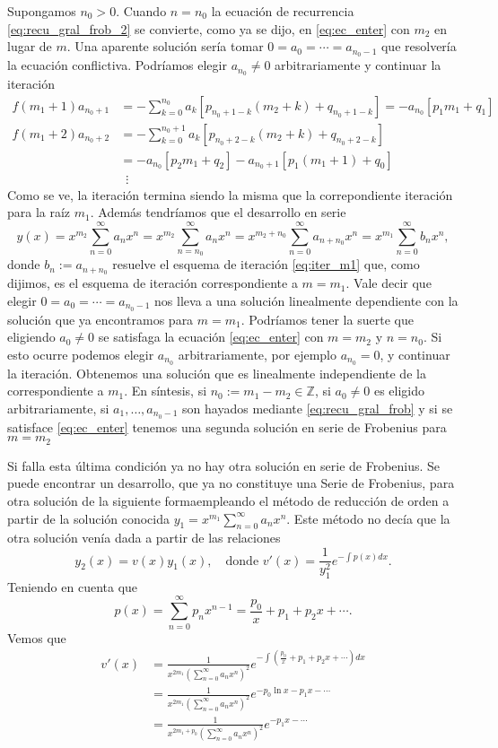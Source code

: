 \documentclass{article}
\newcounter{cor_cont}
\newcounter{ejem_cont}
\renewcommand{\emph}[1]{\textcolor[rgb]{0,0,1}{#1}}
\begin{document}
Supongamos $n_0>0$.  Cuando $n=n_0$ la ecuación de recurrencia  \eqref{eq:recu_gral_frob_2} se convierte, como ya se dijo, en \eqref{eq:ec_enter} con $m_2$ en lugar de $m$. Una aparente solución sería tomar  $0=a_0=\cdots=a_{n_0-1}$ que resolvería la ecuación conflictiva. Podríamos elegir $a_{n_0}\neq 0$ arbitrariamente y continuar la iteración
\begin{equation}\label{eq:iter_m1}
  \begin{split}
    f(m_1+1)a_{n_0+1}&=-\sum_{k=0}^{n_0}a_k\left[p_{n_0+1-k}(m_2+k) + q_{n_0+1-k}\right]=-a_{n_0}[p_1m_1+q_1]\\
   f(m_1+2) a_{n_0+2}&=-\sum_{k=0}^{n_0+1}a_k\left[p_{n_0+2-k}(m_2+k) + q_{n_0+2-k}\right]\\
                   &=-a_{n_0}[p_2m_1+q_2]-a_{n_0+1}[p_1(m_1+1)+q_0]\\
                   &\,\,\,\vdots
  \end{split}
\end{equation}
Como se ve, la iteración termina siendo la misma que la correpondiente iteración para la raíz $m_1$. Además tendríamos que el desarrollo en serie
\[y(x)=x^{m_2}\sum_{n=0}^{\infty}a_nx^n=x^{m_2}\sum_{n=n_0}^{\infty}a_nx^n
 =x^{m_2+n_0}\sum_{n=0}^{\infty}a_{n+n_0}x^n
=x^{m_1}\sum_{n=0}^{\infty}b_nx^n
,\]
donde $b_n:=a_{n+n_0}$ resuelve el esquema de iteración \eqref{eq:iter_m1} que, como dijimos, es el esquema de iteración correspondiente a $m=m_1$. Vale decir que elegir  $0=a_0=\cdots=a_{n_0-1}$ nos lleva a una solución linealmente dependiente con la solución que ya encontramos para $m=m_1$. Podríamos tener la suerte que eligiendo $a_0\neq 0$ se satisfaga la ecuación \eqref{eq:ec_enter} con $m=m_2$ y $n=n_0$. Si esto ocurre podemos elegir $a_{n_0}$ arbitrariamente, por ejemplo $a_{n_0}=0$, y continuar la iteración. Obtenemos una solución que es linealmente independiente   de la correspondiente a $m_1$. En síntesis, \emph{si $n_0:=m_1-m_2\in\mathbb{Z}$, si $a_0\neq 0$ es eligido arbitrariamente, si  $a_1,\ldots,a_{n_0-1}$ son hayados mediante \eqref{eq:recu_gral_frob} y si se satisface  \eqref{eq:ec_enter} tenemos una segunda solución en serie de Frobenius para $m=m_2$}

Si falla esta última condición ya no hay otra solución en serie de Frobenius. Se puede encontrar un desarrollo, que ya no constituye una Serie de Frobenius,  para otra solución de la siguiente formaempleando el método de reducción de orden a partir de la solución conocida $y_1=x^{m_1}\sum_{n=0}^{\infty}a_nx^n$. Este método no decía que la otra solución venía dada a partir de las relaciones
\[y_2(x)=v(x)y_1(x),\quad\text{donde  } v'(x)=\frac{1}{y_1^2}e^{-\int p(x)dx}.\]  
Teniendo en cuenta que
\[p(x)=\sum_{n=0}^{\infty}p_nx^{n-1}=\frac{p_0}{x}+p_1+p_2x+\cdots.\]
Vemos que
\[
   \begin{split}
     v'(x)&=\frac{1}{x^{2m_1}\left(\sum_{n=0}^{\infty}a_nx^n\right)^2}e^{-\int \left(\frac{p_0}{x}+p_1+p_2x+\cdots \right)dx}\\
  &= \frac{1}{x^{2m_1}\left(\sum_{n=0}^{\infty}a_nx^n\right)^2}e^{-p_0 \ln x -p_1x-\cdots }\\
  &= \frac{1}{x^{2m_1+p_0}\left(\sum_{n=0}^{\infty}a_nx^n\right)^2}e^{ -p_1x-\cdots }
   \end{split}
\]
\end{document}

